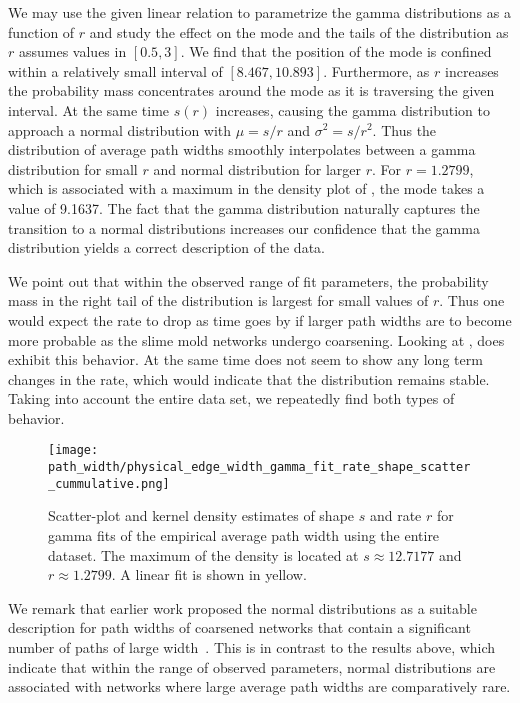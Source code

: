 		We may use the given linear relation to parametrize the gamma distributions as a function of $r$ and study the effect on the mode and the tails of the distribution as $r$ assumes values in $[0.5,3]$. We find that the position of the mode is confined within a relatively small interval of $[8.467,10.893]$. Furthermore, as $r$ increases the probability mass concentrates around the mode as it is traversing the given interval. At the same time $s(r)$ increases, causing the gamma distribution to approach a normal distribution with $\mu = s/r$ and $\sigma^2= s/r^2$. Thus the distribution of average path widths smoothly interpolates between a gamma distribution for small $r$ and normal distribution for larger $r$. For $r = 1.2799$, which is associated with a maximum in the density plot of , the mode takes a value of \SI{9.1637}{\pixel}. The fact that the gamma distribution naturally captures the transition to a normal distributions increases our confidence that the gamma distribution yields a correct description of the data.

		We point out that within the observed range of fit parameters, the probability mass in the right tail of the distribution is largest for small values of $r$. Thus one would expect the rate to drop as time goes by if larger path widths are to become more probable as the slime mold networks undergo coarsening. Looking at ,  does exhibit this behavior. At the same time  does not seem to show any long term changes in the rate, which would indicate that the distribution remains stable. Taking into account the entire data set, we repeatedly find both types of behavior.

		\begin{figure}[!htbp]
			\centering
				\texttt{[image: path\_width/physical\_edge\_width\_gamma\_fit\_rate\_shape\_scatter\_cummulative.png]}
			\caption[Path width distribution - Fit parameter densities]{Scatter-plot and kernel density estimates of shape $s$ and rate $r$ for gamma fits of the empirical average path width using the entire dataset. The maximum of the density is located at $s \approx 12.7177$ and $r \approx 1.2799$. A linear fit is shown in yellow.}
			\label{fig:path_widths_gamma_fit_kde}
		\end{figure}

		We remark that earlier work proposed the normal distributions as a suitable description for path widths of coarsened networks that contain a significant number of paths of large width~\cite{baumgarten2010plasmodial}. This is in contrast to the results above, which indicate that within the range of observed parameters, normal distributions are associated with networks where large average path widths are comparatively rare.

